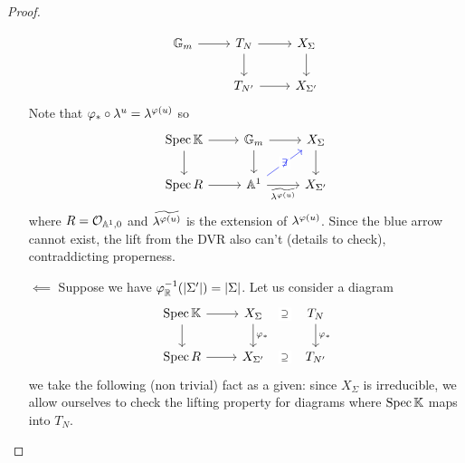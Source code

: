 \begin{proof}
\begin{itemize}
\[\begin{tikzcd}
	{\G_m} & {T_N} & {X_\Sigma} \\
	& {T_{N'}} & {X_{\Sigma'}}
	\arrow[from=1-1, to=1-2]
	\arrow[from=1-2, to=1-3]
	\arrow[from=1-2, to=2-2]
	\arrow[from=1-3, to=2-3]
	\arrow[from=2-2, to=2-3]
\end{tikzcd}\]
Note that $\varphi_\ast\circ \lambda^u=\lambda^{\varphi(u)}$ so
\[\begin{tikzcd}
	{\Spec \K} & {\G_m} & {X_\Sigma} \\
	{\Spec R} & {\A^1} & {X_{\Sigma'}}
	\arrow[from=1-1, to=1-2]
	\arrow[from=1-1, to=2-1]
	\arrow[from=1-2, to=1-3]
	\arrow[from=1-2, to=2-2]
	\arrow[from=1-3, to=2-3]
	\arrow[from=2-1, to=2-2]
	\arrow["{\not\exists}"{description}, color={rgb,255:red,0;green,16;blue,245}, from=2-2, to=1-3]
	\arrow["{\wt{\la^{\vp(u)}}}"', from=2-2, to=2-3]
\end{tikzcd}\]
where $R=\mathcal{O}_{\mathbb{A}^1,0}$ and $\widetilde{\lambda^{\varphi(u)}}$ is the extension of ${\lambda^{\varphi(u)}}$. Since the blue arrow cannot exist, the lift from the DVR also can't (details to check), contraddicting properness.
\item[$\boxed{\impliedby}$] Suppose we have $\varphi_{\mathbb{R}}^{-1}(\left|{\Sigma'}\right|)=\left|{\Sigma}\right|$. Let us consider a diagram
\[\begin{tikzcd}
	{\Spec \K} & {X_\Sigma} & {T_N} \\
	{\Spec R} & {X_{\Sigma'}} & {T_{N'}}
	\arrow[from=1-1, to=1-2]
	\arrow[from=1-1, to=2-1]
	\arrow["{\vp_\ast}", from=1-2, to=2-2]
	\arrow["\supseteq"{description}, draw=none, from=1-3, to=1-2]
	\arrow["{\vp_\ast}", from=1-3, to=2-3]
	\arrow[from=2-1, to=2-2]
	\arrow["\supseteq"{description}, draw=none, from=2-3, to=2-2]
\end{tikzcd}\]
we take the following (non trivial) fact as a given: since $X_\Sigma$ is irreducible, we allow ourselves to check the lifting property for diagrams where $\operatorname{Spec}\mathbb{K}$ maps into $T_N$.


\end{itemize}
\end{proof}
